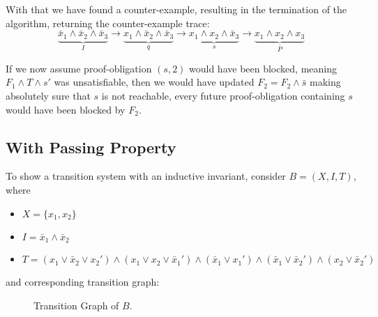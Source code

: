 \documentclass[11pt, a4paper, BCOR=10mm, ngerman]{scrbook}
\begin{document}
With that we have found a counter-example, resulting in the termination of the algorithm, returning the counter-example trace: 
\begin{equation*}
\underbrace{\bar x_1 \land \bar x_2 \land \bar x_3}_{I} \rightarrow \underbrace{x_1 \land \bar x_2 \land \bar x_3}_{q} \rightarrow \underbrace{x_1 \land x_2 \land \bar x_3}_{s} \rightarrow \underbrace{x_1 \land x_2 \land x_3}_{\bar P}   
\end{equation*}

If we now assume proof-obligation $(s, 2)$ would have been blocked, meaning $F_1 \land T \land s'$ was unsatisfiable, then we would have updated $F_2 = F_2 \land \bar s$ making absolutely sure that $s$ is not reachable, every future proof-obligation containing $s$ would have been blocked by $F_2$.

\pagebreak

\subsection{With Passing Property}
To show a transition system with an inductive invariant, consider $B = (X, I, T)$, where
\begin{itemize}
\item $X = \{x_1, x_2\}$
\item $I = \bar x_1 \land \bar x_2 $
\item  $T = ( x_1 \lor \bar x_2 \lor x_2') \land (x_1 \lor x_2 \lor \bar x_1') \land (\bar x_1 \lor x_1') \land (\bar x_1 \lor \bar x_2') \land (x_2 \lor \bar x_2')$
\end{itemize}
and corresponding transition graph: \par

\begin{figure}[H]
\centering
{}
  \caption{Transition Graph of $B$.}
 \end{figure}
 \label{ex1}  
\end{document}
